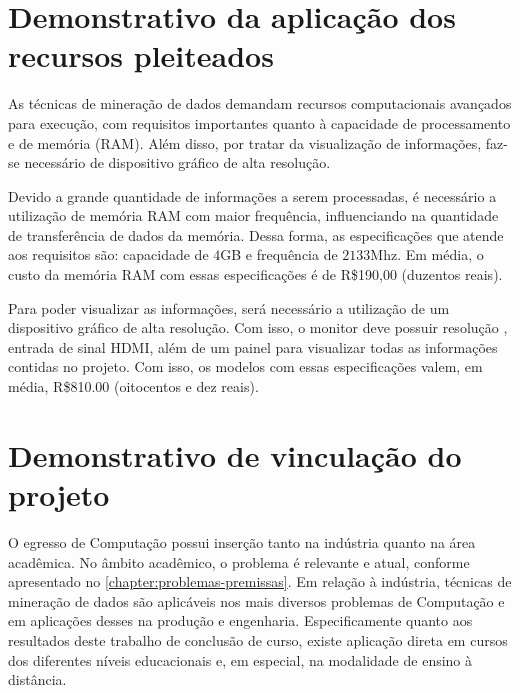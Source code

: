 \chapter{Demonstrativo da aplicação dos recursos pleiteados}

As técnicas de mineração de dados demandam recursos computacionais avançados para
execução, com requisitos importantes quanto à capacidade de processamento e de
memória (RAM). Além disso, por tratar da visualização de informações, faz-se 
necessário de dispositivo gráfico de alta resolução.

Devido a grande quantidade de informações a serem processadas, é necessário a
utilização de memória RAM com maior frequência, influenciando na quantidade de
transferência de dados da memória. Dessa forma, as especificações que atende
aos requisitos são: capacidade de $4$GB e frequência de $2133$Mhz. Em média,
o custo da memória RAM com essas especificações é de R\$190,00 (duzentos reais).

Para poder visualizar as informações, será necessário a utilização de um dispositivo
gráfico de alta resolução. Com isso, o monitor deve possuir resolução ,
entrada de sinal HDMI, além de um painel para visualizar todas as informações contidas
no projeto. Com isso, os modelos com essas especificações valem, em média, R\$810.00
(oitocentos e dez reais).



\chapter{Demonstrativo de vinculação do projeto}

O egresso de Computação possui inserção tanto na indústria quanto na área acadêmica.
No âmbito acadêmico, o problema é relevante e atual, conforme apresentado no
\cref{chapter:problemas-premissas}. Em relação à indústria,
técnicas de mineração de dados são aplicáveis nos mais diversos problemas
de Computação e em aplicações desses na produção e engenharia. Especificamente quanto
aos resultados deste trabalho de conclusão de curso, existe aplicação direta em cursos
dos diferentes níveis educacionais e, em especial, na modalidade de ensino à distância.

